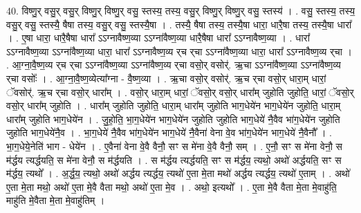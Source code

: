 \documentclass[17pt]{extarticle}
\begin{document}
40. विष्णु॒र् वसु॒र् वसु॒र् विष्णु॒र् विष्णु॒र् वसु॒ स्तस्य॒ तस्य॒ वसु॒र् विष्णु॒र् विष्णु॒र् वसु॒ स्तस्य॑ । . वसु॒ स्तस्य॒ तस्य॒ वसु॒र् वसु॒ स्तस्यै॒ षैषा तस्य॒ वसु॒र् वसु॒ स्तस्यै॒षा । . तस्यै॒ षैषा तस्य॒ तस्यै॒षा धारा॒ धारै॒षा तस्य॒ तस्यै॒षा धारा᳚ । . ए॒षा धारा॒ धारै॒षैषा धारा᳚ ऽऽग्नावैष्ण॒व्या ऽऽग्ना॑वैष्ण॒व्या धारै॒षैषा धारा᳚ ऽऽग्नावैष्ण॒व्या । . धारा᳚ ऽऽग्नावैष्ण॒व्या ऽऽग्ना॑वैष्ण॒व्या धारा॒ धारा᳚ ऽऽग्नावैष्ण॒व्य र्‌च र्‌चा ऽऽग्ना॑वैष्ण॒व्या धारा॒ धारा᳚ ऽऽग्नावैष्ण॒व्य र्‌चा । . आ॒ग्ना॒वै॒ष्ण॒व्य र्‌च र्‌चा ऽऽग्ना॑वैष्ण॒व्या ऽऽग्ना॑वैष्ण॒व्य र्‌चा वसो॒र् वसोर्॑. ऋ॒चा ऽऽग्ना॑वैष्ण॒व्या ऽऽग्ना॑वैष्ण॒व्य र्‌चा वसोः᳚ । . आ॒ग्ना॒वै॒ष्ण॒व्येत्या᳚ग्ना - वै॒ष्ण॒व्या । . ऋ॒चा वसो॒र् वसोर्॑. ऋ॒च र्‌चा वसो॒र् धारा॒म् धारां॒ ॅवसोर्॑. ऋ॒च र्‌चा वसो॒र् धारा᳚म् । . वसो॒र् धारा॒म् धारां॒ ॅवसो॒र् वसो॒र् धारा᳚म् जुहोति जुहोति॒ धारां॒ ॅवसो॒र् वसो॒र् धारा᳚म् जुहोति । . धारा᳚म् जुहोति जुहोति॒ धारा॒म् धारा᳚म् जुहोति भाग॒धेये॑न भाग॒धेये॑न जुहोति॒ धारा॒म् धारा᳚म् जुहोति भाग॒धेये॑न । . जु॒हो॒ति॒ भा॒ग॒धेये॑न भाग॒धेये॑न जुहोति जुहोति भाग॒धेये॑ नै॒वैव भा॑ग॒धेये॑न जुहोति जुहोति भाग॒धेये॑नै॒व । . भा॒ग॒धेये॑ नै॒वैव भा॑ग॒धेये॑न भाग॒धेये॑ नै॒वैना॑ वेना वे॒व भा॑ग॒धेये॑न भाग॒धेये॑
नै॒वैनौ᳚ । . भा॒ग॒धेये॒नेति॑ भाग - धेये॑न । . ए॒वैना॑ वेना वे॒वै वैनौ॒ सꣳ स मे॑ना वे॒वै वैनौ॒ सम् । . ए॒नौ॒ सꣳ स मे॑ना वेनौ॒ स म॑र्द्धय त्यर्द्धयति॒ स मे॑ना वेनौ॒ स म॑र्द्धयति । . स म॑र्द्धय त्यर्द्धयति॒ सꣳ स म॑र्द्धय॒ त्यथो॒ अथो॑ अर्द्धयति॒ सꣳ स म॑र्द्धय॒ त्यथो᳚ । . अ॒र्द्ध॒य॒ त्यथो॒ अथो॑ अर्द्धय त्यर्द्धय॒ त्यथो॑ ए॒ता मे॒ता मथो॑ अर्द्धय त्यर्द्धय॒ त्यथो॑ ए॒ताम् । . अथो॑ ए॒ता मे॒ता मथो॒ अथो॑ ए॒ता मे॒वै वैता मथो॒ अथो॑ ए॒ता मे॒व । . अथो॒ इत्यथो᳚ । . ए॒ता मे॒वै वैता मे॒ता मे॒वाहु॑ति॒ माहु॑ति मे॒वैता मे॒ता मे॒वाहु॑तिम् । \newline
\pagebreak
{}
\end{document}
